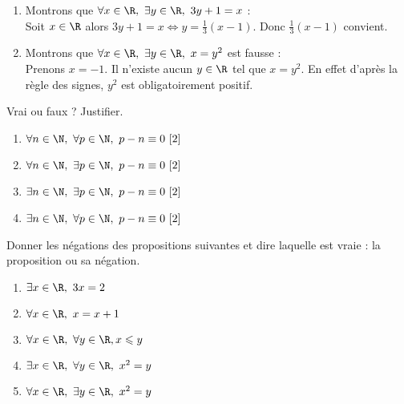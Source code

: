\documentclass[a4paper,12pt,french]{book}
\begin{document}
\begin{exemple}[s]
	\begin{enumerate}[\textbullet]
		\item 	Montrons que $\forall x \in \R,\ \exists y\in \R,\ 3y+1=x$ :\\
				Soit $x\in\R$ alors $3y+1=x\Leftrightarrow y=\frac{1}{3}(x-1)$. Donc  $\frac{1}{3}(x-1)$ convient.
		\item 	Montrons que $\forall x\in\R,\ \exists y\in\R,\ x=y^2$ est fausse :\\
		 		Prenons $x=-1$. Il n'existe aucun $y\in\R$ tel que $x=y^2$. En effet d'après la règle des signes, $y^2$ est obligatoirement positif.
	\end{enumerate}
\end{exemple}

\begin{exercice}[]
	Vrai ou faux ? Justifier.
	\begin{enumerate}[\textbullet]
		\item 	$\forall n \in \N,\ \forall p \in \N,\ p-n \equiv 0\ [2]$
		\item 	$\forall n \in \N,\ \exists p \in \N,\ p-n \equiv 0\ [2]$
		\item 	$\exists n \in \N,\ \exists p \in \N,\ p-n \equiv 0\ [2]$
		\item 	$\exists n \in \N,\ \forall p \in \N,\ p-n \equiv 0\ [2]$
	\end{enumerate}
\end{exercice}

\begin{exercice}[]
	Donner les négations des propositions suivantes et dire laquelle est vraie : la proposition ou sa négation.
	\begin{enumerate}[\textbullet]
		\item 	$\exists x\in\R,\ 3x=2$
		\item 	$\forall x\in\R,\ x=x+1$
		\item 	$\forall x\in\R,\ \forall y\in\R, x\leqslant y$
		\item 	$\exists x\in\R,\ \forall y\in\R,\ x^2=y$
		\item 	$\forall x\in\R,\ \exists y\in\R,\ x^2=y$
	\end{enumerate}
\end{exercice}
\end{document}
